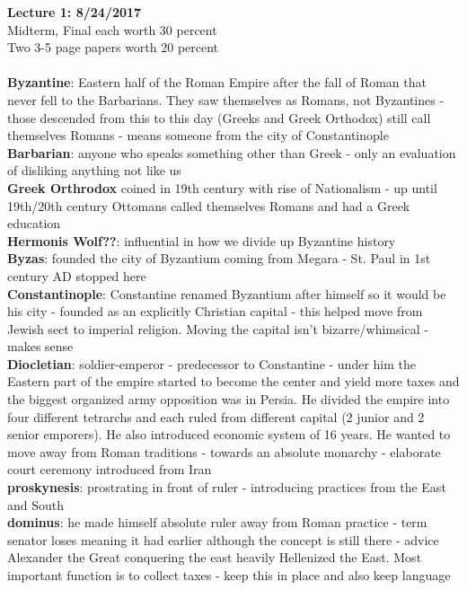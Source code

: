 \documentclass{article}
\begin{document}
\textbf{Lecture 1: 8/24/2017} \\
Midterm, Final each worth 30 percent \\
Two 3-5 page papers worth 20 percent \\ \\
\textbf{Byzantine}: Eastern half of the Roman Empire after the fall of Roman that never fell to the Barbarians. They saw themselves as Romans, not Byzantines - those descended from this to this day (Greeks and Greek Orthodox) still call themselves Romans - means someone from the city of Constantinople \\
\textbf{Barbarian}: anyone who speaks something other than Greek - only an evaluation of disliking anything not like us \\ 
\textbf{Greek Orthrodox} coined in 19th century with rise of Nationalism - up until 19th/20th century Ottomans called themselves Romans and had a Greek education \\
\textbf{Hermonis Wolf??}: influential in how we divide up Byzantine history \\
\textbf{Byzas}: founded the city of Byzantium coming from Megara - St. Paul in 1st century AD stopped here \\
\textbf{Constantinople}: Constantine renamed Byzantium after himself so it would be his city - founded as an explicitly Christian capital - this helped move from Jewish sect to imperial religion. Moving the capital isn't bizarre/whimsical - makes sense \\
\textbf{Diocletian}: soldier-emperor - predecessor to Constantine - under him the Eastern part of the empire started to become the center and yield more taxes and the biggest organized army opposition was in Persia. He divided the empire into four different tetrarchs and each ruled from different capital (2 junior and 2 senior emporers). He also introduced economic system of 16 years. He wanted to move away from Roman traditions - towards an absolute monarchy - elaborate court ceremony introduced from Iran \\
\textbf{proskynesis}: prostrating in front of ruler - introducing practices from the East and South \\
\textbf{dominus}: he made himself absolute ruler away from Roman practice - term senator loses meaning it had earlier although the concept is still there - advice \\
Alexander the Great conquering the east heavily Hellenized the East. Most important function is to collect taxes - keep this in place and also keep language \\
\end{document}
